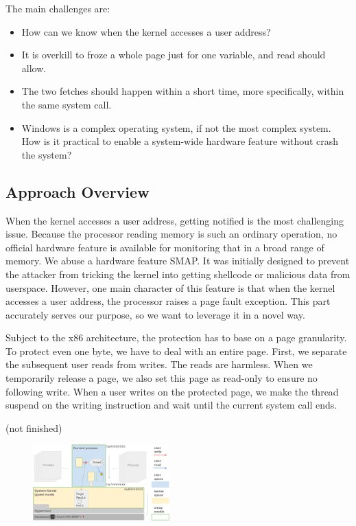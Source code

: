 The main challenges are:

\begin{itemize}
	\item How can we know when the kernel accesses a user address?
	\item It is overkill to froze a whole page just for one variable, and read should allow.
	\item The two fetches should happen within a short time, more specifically, within the same system call. 
	\item Windows is a complex operating system, if not the most complex system. How is it practical to enable a system-wide hardware feature without crash the system?
\end{itemize}


\subsection{Approach Overview}

When the kernel accesses a user address, getting notified is the most challenging issue. Because the processor reading memory is such an ordinary operation, no official hardware feature is available for monitoring that in a broad range of memory. We abuse a hardware feature SMAP. It was initially designed to prevent the attacker from tricking the kernel into getting shellcode or malicious data from userspace. However, one main character of this feature is that when the kernel accesses a user address, the processor raises a page fault exception. This part accurately serves our purpose, so we want to leverage it in a novel way.

Subject to the x86 architecture, the protection has to base on a page granularity. To protect even one byte, we have to deal with an entire page.
First, we separate the subsequent user reads from writes. The reads are harmless.  When we temporarily release a page, we also set this page as read-only to ensure no following write. When a user writes on the protected page, we make the thread suspend on the writing instruction and wait until the current system call ends.

(not finished)

\begin{figure}[th]
  \includegraphics[width=0.47\textwidth]{figures/ktoctou-overview}
  \centering
  \caption{ }
  \label{fig:ktoctou-overview}
\end{figure}
